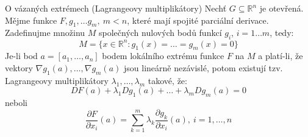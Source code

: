 \begin{vetaN}{O vázaných extrémech (Lagrangeovy multiplikátory)}
Nechť $G \subseteq \mathbb{R}^n$ je otevřená. Mějme funkce $F, g_1, \ldots g_m,~m<n$, které mají spojité parciální derivace. Zadefinujme množinu $M$ společných nulových bodů funkcí $g_i$, $i=1 \ldots m$, tedy:
$$M = \{ x \in \mathbb{R}^n: g_1(x) = \ldots = g_m(x) = 0\}$$
Je-li bod $a = [a_1,\ldots,a_n]$ bodem lokálního extrému funkce $F$ na $M$ a platí-li, že vektory $\nabla g_1(a), \ldots, \nabla g_m(a)$ jsou lineárně nezávislé, potom existují tzv. Lagrangeovy multiplikátory $\lambda_1, \ldots, \lambda_m$ takové, že:
$$DF(a) + \lambda_1 Dg_1(a) + \ldots + \lambda_m Dg_m(a) = 0$$
neboli
$$\frac{\partial F}{\partial x_i}(a) = \sum_{k=1}^m\lambda_k\frac{\partial g_k}{\partial x_i}(a),~i=1,\ldots,n$$
\end{vetaN}
